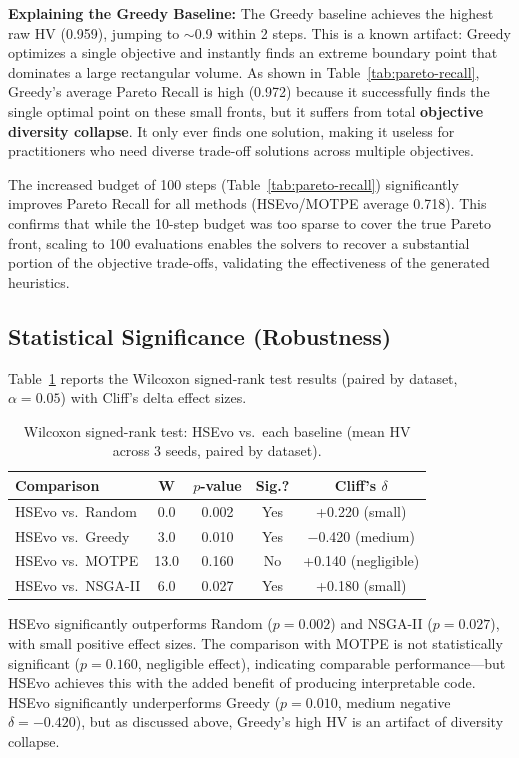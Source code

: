 \documentclass[sigconf,nonacm]{acmart}
\begin{document}
\textbf{Explaining the Greedy Baseline:} The Greedy baseline achieves the highest raw HV (0.959), jumping to $\sim$0.9 within 2 steps. This is a known artifact: Greedy optimizes a single objective and instantly finds an extreme boundary point that dominates a large rectangular volume. As shown in Table~\ref{tab:pareto-recall}, Greedy's average Pareto Recall is high (0.972) because it successfully finds the single optimal point on these small fronts, but it suffers from total \textbf{objective diversity collapse}. It only ever finds one solution, making it useless for practitioners who need diverse trade-off solutions across multiple objectives.

The increased budget of 100 steps (Table~\ref{tab:pareto-recall}) significantly improves Pareto Recall for all methods (HSEvo/MOTPE average 0.718). This confirms that while the 10-step budget was too sparse to cover the true Pareto front, scaling to 100 evaluations enables the solvers to recover a substantial portion of the objective trade-offs, validating the effectiveness of the generated heuristics.

\subsection{Statistical Significance (Robustness)}
Table~\ref{tab:wilcoxon} reports the Wilcoxon signed-rank test results (paired by dataset, $\alpha=0.05$) with Cliff's delta effect sizes.

\begin{table}[h]
\caption{Wilcoxon signed-rank test: HSEvo vs.\ each baseline (mean HV across 3 seeds, paired by dataset).}
\label{tab:wilcoxon}
\begin{tabular}{lcccc}
\toprule
\textbf{Comparison} & \textbf{W} & \textbf{$p$-value} & \textbf{Sig.?} & \textbf{Cliff's $\delta$} \\
\midrule
HSEvo vs.\ Random  & 0.0  & 0.002 & Yes & +0.220 (small) \\
HSEvo vs.\ Greedy  & 3.0  & 0.010 & Yes & $-$0.420 (medium) \\
HSEvo vs.\ MOTPE   & 13.0 & 0.160 & No  & +0.140 (negligible) \\
HSEvo vs.\ NSGA-II & 6.0  & 0.027 & Yes & +0.180 (small) \\
\bottomrule
\end{tabular}
\end{table}

HSEvo significantly outperforms Random ($p=0.002$) and NSGA-II ($p=0.027$), with small positive effect sizes. The comparison with MOTPE is not statistically significant ($p=0.160$, negligible effect), indicating comparable performance---but HSEvo achieves this with the added benefit of producing interpretable code. HSEvo significantly underperforms Greedy ($p=0.010$, medium negative $\delta=-0.420$), but as discussed above, Greedy's high HV is an artifact of diversity collapse.
\end{document}
